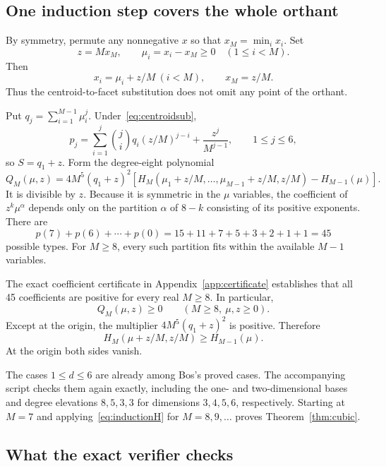 \documentclass[11pt,a4paper]{article}
\theoremstyle{remark}
\begin{document}
\subsection{One induction step covers the whole orthant}

By symmetry, permute any nonnegative $x$ so that $x_M=\min_i x_i$. Set
\[
 z=Mx_M,\qquad \mu_i=x_i-x_M\ge0\quad(1\le i<M).
\]
Then
\begin{equation}\label{eq:centroidsub}
 x_i=\mu_i+z/M\ (i<M),\qquad x_M=z/M.
\end{equation}
Thus the centroid-to-facet substitution does not omit any point of the orthant.

Put $q_j=\sum_{i=1}^{M-1}\mu_i^j$. Under~\eqref{eq:centroidsub},
\begin{equation}\label{eq:pq}
 p_j=\sum_{i=1}^j\binom ji q_i(z/M)^{j-i}+\frac{z^j}{M^{j-1}},
 \qquad 1\le j\le6,
\end{equation}
so $S=q_1+z$. Form the degree-eight polynomial
\begin{equation}\label{eq:Q}
 Q_M(\mu,z)=4M^5(q_1+z)^2
 \left[H_M(\mu_1+z/M,\ldots,\mu_{M-1}+z/M,z/M)
       -H_{M-1}(\mu)\right].
\end{equation}
It is divisible by $z$. Because it is symmetric in the $\mu$ variables, the coefficient of $z^k\mu^\alpha$ depends only on the partition $\alpha$ of $8-k$ consisting of its positive exponents. There are
\[
 p(7)+p(6)+\cdots+p(0)=15+11+7+5+3+2+1+1=45
\]
possible types. For $M\ge8$, every such partition fits within the available $M-1$ variables.

The exact coefficient certificate in Appendix~\ref{app:certificate} establishes that all 45 coefficients are positive for every real $M\ge8$. In particular,
\[
 Q_M(\mu,z)\ge0\qquad(M\ge8,\ \mu,z\ge0).
\]
Except at the origin, the multiplier $4M^5(q_1+z)^2$ is positive. Therefore
\begin{equation}\label{eq:inductionH}
 H_M(\mu+z/M,z/M)\ge H_{M-1}(\mu).
\end{equation}
At the origin both sides vanish.

The cases $1\le d\le6$ are already among Bos's proved cases. The accompanying script checks them again exactly, including the one- and two-dimensional bases and degree elevations $8,5,3,3$ for dimensions $3,4,5,6$, respectively. Starting at $M=7$ and applying~\eqref{eq:inductionH} for $M=8,9,\ldots$ proves Theorem~\ref{thm:cubic}.

\subsection{What the exact verifier checks}
\end{document}
